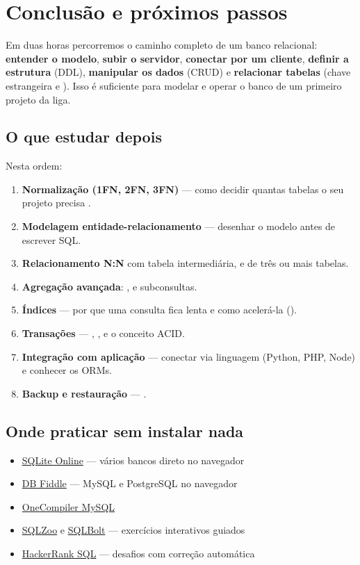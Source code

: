 \chapter{Conclusão e próximos passos}

Em duas horas percorremos o caminho completo de um banco relacional:
\textbf{entender o modelo}, \textbf{subir o servidor}, \textbf{conectar por um
cliente}, \textbf{definir a estrutura} (DDL), \textbf{manipular os dados}
(CRUD) e \textbf{relacionar tabelas} (chave estrangeira e ). Isso
é suficiente para modelar e operar o banco de um primeiro projeto da liga.

\section{O que estudar depois}

Nesta ordem:

\begin{enumerate}
    \item \textbf{Normalização (1FN, 2FN, 3FN)} --- como decidir quantas
          tabelas o seu projeto precisa \cite{elmasri2016}.
    \item \textbf{Modelagem entidade-relacionamento} --- desenhar o modelo
          antes de escrever SQL.
    \item \textbf{Relacionamento N:N} com tabela intermediária, e
           de três ou mais tabelas.
    \item \textbf{Agregação avançada}: ,  e
          subconsultas.
    \item \textbf{Índices} --- por que uma consulta fica lenta e como
          acelerá-la ().
    \item \textbf{Transações} --- ,
          ,  e o conceito ACID.
    \item \textbf{Integração com aplicação} --- conectar via linguagem
          (Python, PHP, Node) e conhecer os ORMs.
    \item \textbf{Backup e restauração} --- .
\end{enumerate}

\section{Onde praticar sem instalar nada}

\begin{itemize}
    \item \href{https://sqliteonline.com/}{SQLite Online} --- vários bancos direto no navegador
    \item \href{https://www.db-fiddle.com/}{DB Fiddle} --- MySQL e PostgreSQL no navegador
    \item \href{https://onecompiler.com/mysql/}{OneCompiler MySQL}
    \item \href{https://sqlzoo.net/}{SQLZoo} e \href{https://sqlbolt.com/}{SQLBolt} --- exercícios interativos guiados
    \item \href{https://www.hackerrank.com/domains/sql}{HackerRank SQL} --- desafios com correção automática
\end{itemize}

